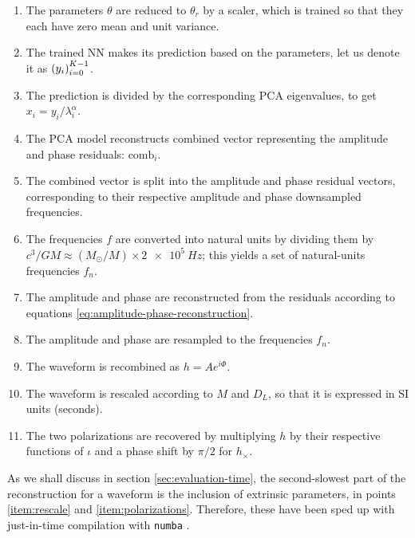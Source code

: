 \documentclass[main.tex]{subfiles}
\begin{document}
\begin{enumerate}
    \item The parameters \(\theta \) are reduced to \(\theta _r\) by a scaler, which is trained so that they each have zero mean and unit variance. \label{item:param-reduction}
    \item The trained \ac{NN} makes its prediction based on the parameters, let us denote it as \(\qty(y_i)_{i=0}^{K-1}\). \label{item:nn-prediction}
    \item The prediction is divided by the corresponding \ac{PCA} eigenvalues, to get \(x_i = y_i / \lambda _i^{\alpha }\).
    \item The \ac{PCA} model reconstructs combined vector representing the amplitude and phase residuals: \(\text{comb}_i\). \label{item:pca-reconstruction}
    \item The combined vector is split into the amplitude and phase residual vectors, corresponding to their respective amplitude and phase downsampled frequencies. \label{item:combined-split}
    \item The frequencies \(f\) are converted into natural units by dividing them by \(c^3 / GM \approx (M_{\odot} / M) \times  \SI{2e5}{Hz}\); this yields a set of natural-units frequencies \(f_n\). \label{item:frequency-conversion}
    \item The amplitude and phase are reconstructed from the residuals according to equations \eqref{eq:amplitude-phase-reconstruction}. \label{item:tf2}
    \item The amplitude and phase are resampled to the frequencies \(f_n\). \label{item:resample}
    \item The waveform is recombined as \(h = A e^{i \Phi }\). \label{item:recombine}
    \item The waveform is rescaled according to \(M\) and \(D_L\), so that it is expressed in SI units (seconds). \label{item:rescale}
    \item The two polarizations are recovered by multiplying \(h\) by their respective functions of \(\iota \) and a phase shift by \(\pi /2\) for \(h_ \times \). \label{item:polarizations}
\end{enumerate}

As we shall discuss in section \ref{sec:evaluation-time}, the second-slowest part of the reconstruction for a waveform is the inclusion of extrinsic parameters, in points \ref{item:rescale} and \ref{item:polarizations}. 
Therefore, these have been sped up with just-in-time compilation with \texttt{numba} \cite{lamNumbaLLVMbasedPython2015}.
\end{document}

